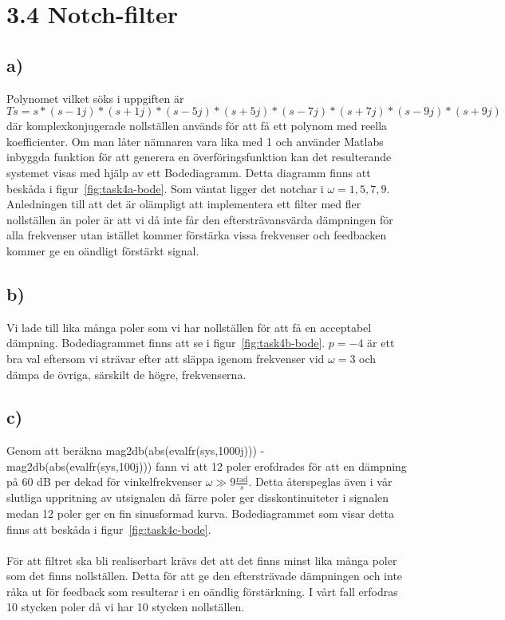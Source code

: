 \section*{3.4 Notch-filter}
\subsection*{a)}
Polynomet vilket söks i uppgiften är 
$Ts = s*(s-1j)*(s+1j)*(s-5j)*(s+5j)*(s-7j)*(s+7j)*(s-9j)*(s+9j)$ där
komplexkonjugerade nollställen används för att få ett polynom med reella
koefficienter. Om man låter nämnaren vara lika med 1 och använder Matlabs
inbyggda funktion för att generera en överföringsfunktion kan det resulterande
systemet visas med hjälp av ett Bodediagramm. Detta diagramm finns att beskåda i
figur~\ref{fig:task4a-bode}. Som väntat ligger det notchar i $\omega = 1, 5, 7,
9$. Anledningen till att det är olämpligt att implementera ett filter med fler
nollställen än poler är att vi då inte får den eftersträvansvärda dämpningen
för alla frekvenser utan istället kommer förstärka vissa frekvenser och
feedbacken kommer ge en oändligt förstärkt signal.

\subsection*{b)}
Vi lade till lika många poler som vi har nollställen för att få en acceptabel
dämpning. Bodediagrammet finns att se i figur~\ref{fig:task4b-bode}. $p=-4$ är
ett bra val eftersom vi strävar efter att släppa igenom frekvenser vid
$\omega = 3$ och dämpa de övriga, särskilt de högre, frekvenserna.

\subsection*{c)}
Genom att beräkna mag2db(abs(evalfr(sys,1000j))) -
mag2db(abs(evalfr(sys,100j))) fann vi att 12 poler erofdrades för att en
dämpning på 60 dB per dekad för vinkelfrekvenser $\omega \gg 9 
\frac{\text{rad}}{s}$. Detta återspeglas även i vår slutliga uppritning av
utsignalen då färre poler ger disskontinuiteter i signalen medan 12 poler ger
en fin sinusformad kurva. Bodediagrammet som visar detta finns att beskåda i
figur~\ref{fig:task4c-bode}.\\\\
För att filtret ska bli realiserbart krävs det att det finns minst lika många
poler som det finns nollställen. Detta för att ge den eftersträvade dämpningen och inte
råka ut för feedback som resulterar i en oändlig förstärkning. I vårt fall
erfodras 10 stycken poler då vi har 10 stycken nollställen.

